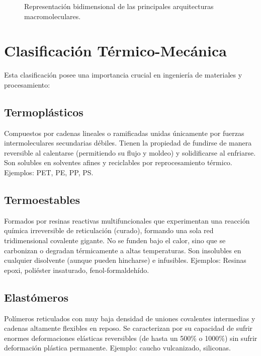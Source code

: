 \begin{figure}[h]
    \centering
    \caption{Representación bidimensional de las principales arquitecturas macromoleculares.}
    \label{fig:arquitecturas}
\end{figure}

\section{Clasificación Térmico-Mecánica}

Esta clasificación posee una importancia crucial en ingeniería de materiales y procesamiento:

\subsection{Termoplásticos}
Compuestos por cadenas lineales o ramificadas unidas únicamente por fuerzas intermoleculares secundarias débiles. Tienen la propiedad de fundirse de manera reversible al calentarse (permitiendo su flujo y moldeo) y solidificarse al enfriarse. Son solubles en solventes afines y reciclables por reprocesamiento térmico. Ejemplos: PET, PE, PP, PS.

\subsection{Termoestables}
Formados por resinas reactivas multifuncionales que experimentan una reacción química irreversible de reticulación (curado), formando una sola red tridimensional covalente gigante. No se funden bajo el calor, sino que se carbonizan o degradan térmicamente a altas temperaturas. Son insolubles en cualquier disolvente (aunque pueden hincharse) e infusibles. Ejemplos: Resinas epoxi, poliéster insaturado, fenol-formaldehído.

\subsection{Elastómeros}
Polímeros reticulados con muy baja densidad de uniones covalentes intermedias y cadenas altamente flexibles en reposo. Se caracterizan por su capacidad de sufrir enormes deformaciones elásticas reversibles (de hasta un 500\% o 1000\%) sin sufrir deformación plástica permanente. Ejemplo: caucho vulcanizado, siliconas.

